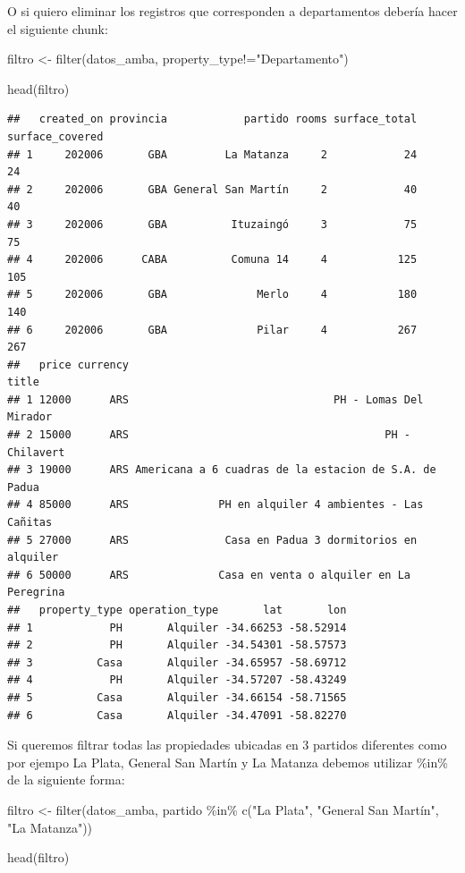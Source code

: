 \documentclass[
  spanish,
]{book}
\newenvironment{Shaded}{\begin{snugshade}}{\end{snugshade}}
\newcommand{\FunctionTok}[1]{\textcolor[rgb]{0.00,0.00,0.00}{#1}}
\newcommand{\NormalTok}[1]{#1}
\newcommand{\OtherTok}[1]{\textcolor[rgb]{0.56,0.35,0.01}{#1}}
\newcommand{\SpecialCharTok}[1]{\textcolor[rgb]{0.00,0.00,0.00}{#1}}
\newcommand{\StringTok}[1]{\textcolor[rgb]{0.31,0.60,0.02}{#1}}
\begin{document}
O si quiero eliminar los registros que corresponden a departamentos debería hacer el siguiente chunk:

\begin{Shaded}
\begin{Highlighting}[]
\NormalTok{filtro }\OtherTok{\textless{}{-}} \FunctionTok{filter}\NormalTok{(datos\_amba, property\_type}\SpecialCharTok{!=}\StringTok{"Departamento"}\NormalTok{)}

\FunctionTok{head}\NormalTok{(filtro)}
\end{Highlighting}
\end{Shaded}

\begin{verbatim}
##   created_on provincia            partido rooms surface_total surface_covered
## 1     202006       GBA         La Matanza     2            24              24
## 2     202006       GBA General San Martín     2            40              40
## 3     202006       GBA          Ituzaingó     3            75              75
## 4     202006      CABA          Comuna 14     4           125             105
## 5     202006       GBA              Merlo     4           180             140
## 6     202006       GBA              Pilar     4           267             267
##   price currency                                                 title
## 1 12000      ARS                                PH - Lomas Del Mirador
## 2 15000      ARS                                        PH - Chilavert
## 3 19000      ARS Americana a 6 cuadras de la estacion de S.A. de Padua
## 4 85000      ARS              PH en alquiler 4 ambientes - Las Cañitas
## 5 27000      ARS               Casa en Padua 3 dormitorios en alquiler
## 6 50000      ARS              Casa en venta o alquiler en La Peregrina
##   property_type operation_type       lat       lon
## 1            PH       Alquiler -34.66253 -58.52914
## 2            PH       Alquiler -34.54301 -58.57573
## 3          Casa       Alquiler -34.65957 -58.69712
## 4            PH       Alquiler -34.57207 -58.43249
## 5          Casa       Alquiler -34.66154 -58.71565
## 6          Casa       Alquiler -34.47091 -58.82270
\end{verbatim}

Si queremos filtrar todas las propiedades ubicadas en 3 partidos diferentes como por ejempo La Plata, General San Martín y La Matanza debemos utilizar \%in\% de la siguiente forma:

\begin{Shaded}
\begin{Highlighting}[]
\NormalTok{filtro }\OtherTok{\textless{}{-}} \FunctionTok{filter}\NormalTok{(datos\_amba, partido }\SpecialCharTok{\%in\%} \FunctionTok{c}\NormalTok{(}\StringTok{"La Plata"}\NormalTok{, }\StringTok{"General San Martín"}\NormalTok{, }\StringTok{"La Matanza"}\NormalTok{))}

\FunctionTok{head}\NormalTok{(filtro)}
\end{Highlighting}
\end{Shaded}
\end{document}
